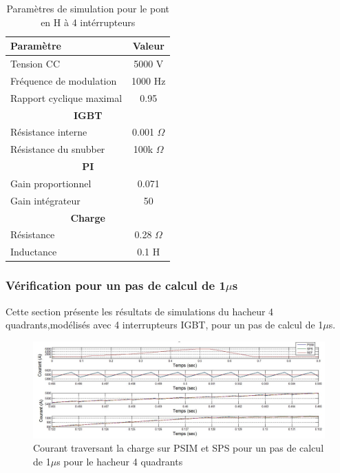 \documentclass[11pt,letterpaper,final]{report}
\begin{document}
\begin{table}[htb]
\centering
\begin{tabular}{|l|c|} 
  \hline
  \textbf{Paramètre} & \textbf{Valeur}  \\
  \hline\hline
  Tension CC & 5000 V\\ \hline
  Fréquence de modulation & 1000 Hz\\ \hline
  Rapport cyclique maximal & 0.95 \\ \hline \hline
  \multicolumn{2}{|c|}{\textbf{IGBT}}\\ \hline
  Résistance interne & 0.001 $\Omega$\\
  Résistance du snubber & 100k $\Omega$\\ \hline \hline
   \multicolumn{2}{|c|}{\textbf{PI}}\\ \hline
  Gain proportionnel & 0.071 \\
  Gain intégrateur & 50 \\ \hline \hline
  \multicolumn{2}{|c|}{\textbf{Charge}}\\ \hline
  Résistance & 0.28 $\Omega$\\
  Inductance & 0.1 H\\
  \hline
\end{tabular}
\caption{Paramètres de simulation pour le pont en H à 4 intérrupteurs}
\label{p_hash}
\end{table}

\subsubsection{Vérification pour un pas de calcul de 1$\mu$s}
Cette section présente les résultats de simulations du hacheur 4 quadrants,modélisés avec 4 interrupteurs IGBT, pour un pas de calcul de 1$\mu$s. 


\begin{figure}[htb]
\centering
\includegraphics[scale=0.5]{Fig/Hacheur4Quadrants/HacheurCourantCharge1u.jpg}
\caption{Courant traversant la charge sur PSIM et SPS pour un pas de calcul de 1$\mu$s pour le hacheur 4 quadrants}
\label{hc_cou_ch_1}
\end{figure}
\end{document}
